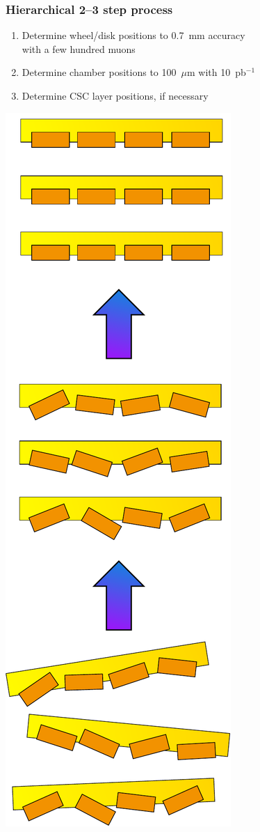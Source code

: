 \documentclass[compress]{beamer}
\begin{document}
\begin{frame}
\frametitle{Hierarchical 2--3 step process}

\begin{enumerate}\setlength{\itemsep}{0.3 cm}
\item Determine wheel/disk positions to 0.7~mm accuracy \\ with
a few hundred muons
\item Determine chamber positions to 100~$\mu$m with 10~pb$^{-1}$
\item Determine CSC layer positions, if necessary
\end{enumerate}
\begin{center}
\includegraphics[height=\linewidth, angle=-90]{heirarchial_procedure.pdf}
\end{center}
\end{frame}
\end{document}
